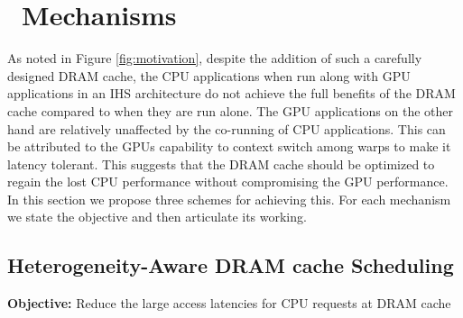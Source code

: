 \section{\cachename\ Mechanisms}

As noted in Figure \ref{fig:motivation}, despite the addition of such a carefully designed DRAM cache, the CPU applications when run along with GPU applications in an IHS architecture do not achieve the full benefits of the DRAM cache compared to when they are run alone. The GPU applications on the other hand are relatively unaffected by the co-running of CPU applications. This can be attributed to the GPUs capability to context switch among warps to make it latency tolerant. This suggests that the DRAM cache should be optimized to regain the lost CPU performance without compromising the GPU performance. In this section we propose three schemes for achieving this. For each mechanism we state the objective and then articulate its working.


\subsection{Heterogeneity-Aware DRAM cache Scheduling} 
\textbf{Objective:} Reduce the large access latencies for CPU requests at DRAM cache
